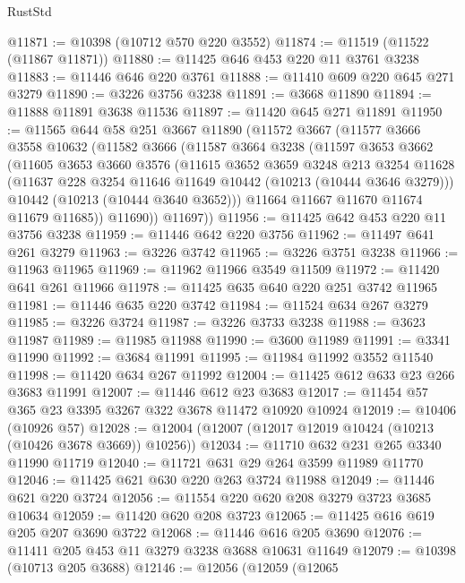 \begin{lexlean}{RustStd}
\begin{coremodule}
@11871 := @10398 (@10712 @570 @220 @3552)
@11874 := @11519 (@11522 (@11867 @11871))
@11880 := @11425 @646 @453 @220 @11 @3761 @3238
@11883 := @11446 @646 @220 @3761
@11888 := @11410 @609 @220 @645 @271 @3279
@11890 := @3226 @3756 @3238
@11891 := @3668 @11890
@11894 := @11888 @11891 @3638 @11536
@11897 := @11420 @645 @271 @11891
@11950 := @11565
    @644
    @58
    @251
    @3667
    @11890
    (@11572
      @3667
      (@11577
        @3666
        @3558
        @10632
        (@11582
          @3666
          (@11587
            @3664
            @3238
            (@11597
              @3653
              @3662
              (@11605
                @3653
                @3660
                @3576
                (@11615
                  @3652
                  @3659
                  @3248
                  @213
                  @3254
                  @11628
                  (@11637 @228 @3254 @11646 @11649 @10442 (@10213 (@10444 @3646 @3279)))
                  @10442
                  (@10213 (@10444 @3640 @3652)))
                @11664
                @11667
                @11670
                @11674
                @11679
                @11685))
            @11690))
        @11697))
@11956 := @11425 @642 @453 @220 @11 @3756 @3238
@11959 := @11446 @642 @220 @3756
@11962 := @11497 @641 @261 @3279
@11963 := @3226 @3742
@11965 := @3226 @3751 @3238
@11966 := @11963 @11965
@11969 := @11962 @11966 @3549 @11509
@11972 := @11420 @641 @261 @11966
@11978 := @11425 @635 @640 @220 @251 @3742 @11965
@11981 := @11446 @635 @220 @3742
@11984 := @11524 @634 @267 @3279
@11985 := @3226 @3724
@11987 := @3226 @3733 @3238
@11988 := @3623 @11987
@11989 := @11985 @11988
@11990 := @3600 @11989
@11991 := @3341 @11990
@11992 := @3684 @11991
@11995 := @11984 @11992 @3552 @11540
@11998 := @11420 @634 @267 @11992
@12004 := @11425 @612 @633 @23 @266 @3683 @11991
@12007 := @11446 @612 @23 @3683
@12017 := @11454 @57 @365 @23 @3395 @3267 @322 @3678 @11472 @10920 @10924
@12019 := @10406 (@10926 @57)
@12028 := @12004 (@12007 (@12017 @12019 @10424 (@10213 (@10426 @3678 @3669)) @10256))
@12034 := @11710 @632 @231 @265 @3340 @11990 @11719
@12040 := @11721 @631 @29 @264 @3599 @11989 @11770
@12046 := @11425 @621 @630 @220 @263 @3724 @11988
@12049 := @11446 @621 @220 @3724
@12056 := @11554 @220 @620 @208 @3279 @3723 @3685 @10634
@12059 := @11420 @620 @208 @3723
@12065 := @11425 @616 @619 @205 @207 @3690 @3722
@12068 := @11446 @616 @205 @3690
@12076 := @11411 @205 @453 @11 @3279 @3238 @3688 @10631 @11649
@12079 := @10398 (@10713 @205 @3688)
@12146 := @12056
    (@12059
      (@12065

\end{coremodule}
\end{lexlean}
